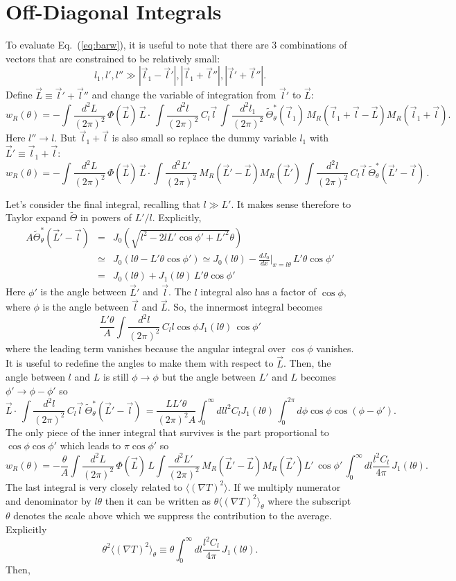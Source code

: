 \documentclass[prd,amsmath,amssymb,floatfix,superscriptaddress,nofootinbib]{revtex4-1}
\def\be{\begin{equation}}
\def\ee{\end{equation}}
\def\bea{\begin{eqnarray}}
\def\eea{\end{eqnarray}}
\newcommand{\vs}{\nonumber\\}
\newcommand{\ec}[1]{Eq.~(\ref{eq:#1})}
\newcommand{\eql}[1]{\label{eq:#1}}
\begin{document}
\section{Off-Diagonal Integrals}
To evaluate \ec{barw}, it is useful to note that 
there are 3 combinations of vectors that are constrained to be relatively small:
\be
l_1, l', l'' \gg |\vec l_1-\vec l'|, |\vec l_1+\vec l''|, |\vec l'+\vec l''|.\ee
Define $\vec L\equiv \vec l'+\vec l''$ and change the variable of integration from $\vec l'$ to $\vec L$:
\be
w_R(\theta) =  -\int \frac{d^2L}{(2\pi)^2}\, \Phi(\vec L)\, \vec L \cdot
\,\int \frac{d^2l}{(2\pi)^2}\,C_{l}\vec l\,
\int \frac{d^2l_1}{(2\pi)^2}\, \tilde \Theta_\theta^*(\vec l_1)\, 
 M_R(\vec l_1+\vec l-\vec L)  M_R(\vec l_1+\vec l)
.
\ee
Here $l''\rightarrow l$. But $\vec l_1+\vec l$ is also small so replace the dummy variable $l_1$ with $\vec L'\equiv \vec l_1 + \vec l$:
\be
w_R(\theta) =  -\int \frac{d^2L}{(2\pi)^2}\, \Phi(\vec L)\, \vec L \cdot
\int \frac{d^2L'}{(2\pi)^2}\, M_R(\vec L'-\vec L)  M_R(\vec L')
\,\int \frac{d^2l}{(2\pi)^2}\,C_{l}\vec l\,\tilde \Theta_\theta^*(\vec L'-\vec l)\, 
 .
\ee

Let's consider the final integral, recalling that $l\gg L'$. It makes sense therefore to Taylor expand $\tilde\Theta$ in powers of $L'/l$. Explicitly,
\bea
A\tilde \Theta_\theta^*(\vec L'-\vec l) &=& J_0(\sqrt{l^2-2lL'\cos\phi'+L'^2}\theta)
\vs
&\simeq& J_0\left(l\theta - L'\theta\cos\phi'\right)
\simeq
J_0(l\theta) - \frac{dJ_0}{dx}\bigg\vert_{x=l\theta}\, L'\theta\cos\phi'
\vs
&=&J_0(l\theta) + J_1(l\theta)\, L'\theta\cos\phi'
\eea
Here $\phi'$ is the angle between $\vec L'$ and $\vec l$. The $l$ integral also has a factor of $\cos\phi$, where $\phi$ is the angle between $\vec l$ and $\vec L$. So, the innermost integral becomes
\be
\frac{L'\theta}A\int \frac{d^2l}{(2\pi)^2}\,C_{l} l\cos\phi J_1(l\theta)\, \cos\phi'\ee
where the leading term vanishes because the angular integral over $\cos\phi$ vanishes. It is useful to redefine the angles to make them with respect to $\vec L$. Then, the angle between $l$ and $L$ is still $\phi\rightarrow \phi$ but the angle between $L'$ and $L$ becomes $\phi'\rightarrow \phi-\phi'$ so 
\be
\vec L\cdot\,\int \frac{d^2l}{(2\pi)^2}\,C_{l}\vec l\,\tilde \Theta_\theta^*(\vec L'-\vec l)\, 
= \frac{LL'\theta}{(2\pi)^2A} \int_0^\infty dl l^2C_l J_1(l\theta) \,\int_0^{2\pi} d\phi\cos\phi \cos(\phi-\phi').
\ee
The only piece of the inner integral that survives is the part proportional to $\cos\phi\cos\phi'$ which leads to $\pi\cos\phi'$ so
\be
w_R(\theta) =  - \frac{\theta}{A} \int \frac{d^2L}{(2\pi)^2}\, \Phi(\vec L)\, L 
\int \frac{d^2L'}{(2\pi)^2}\, M_R(\vec L'-\vec L)  M_R(\vec L')L'\,\cos\phi'
\,\int_0^\infty dl \frac{l^2C_l}{4\pi}\,J_1(l\theta)  .
\ee
The last integral is very closely related to $\langle (\nabla T)^2\rangle$. If we multiply numerator and denominator by $l\theta$ then it can be written as $\theta\langle (\nabla T)^2\rangle_\theta$ where the subscript $\theta$ denotes the scale above which we suppress the contribution to the average. Explicitly
\be
\theta^2\langle (\nabla T)^2\rangle_\theta \equiv \theta\int_0^\infty dl \frac{l^2C_l}{4\pi}\,J_1(l\theta).\eql{dlnt}\ee
Then,
\end{document}

